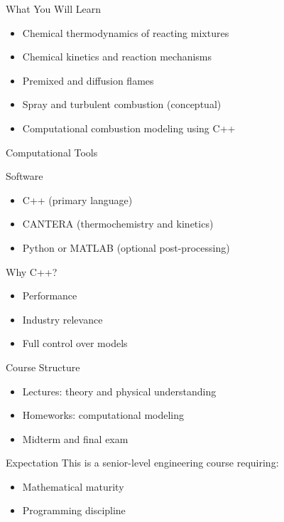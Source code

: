 \documentclass[aspectratio=169]{beamer}
\begin{document}
\begin{frame}{What You Will Learn}

\begin{itemize}
  \item Chemical thermodynamics of reacting mixtures
  \item Chemical kinetics and reaction mechanisms
  \item Premixed and diffusion flames
  \item Spray and turbulent combustion (conceptual)
  \item Computational combustion modeling using C++
\end{itemize}

\end{frame}

\begin{frame}{Computational Tools}

\begin{block}{Software}
\begin{itemize}
  \item C++ (primary language)
  \item CANTERA (thermochemistry and kinetics)
  \item Python or MATLAB (optional post-processing)
\end{itemize}
\end{block}

\pause

\begin{block}{Why C++?}
\begin{itemize}
  \item Performance
  \item Industry relevance
  \item Full control over models
\end{itemize}
\end{block}
\end{frame}

\begin{frame}{Course Structure}
\begin{itemize}
  \item Lectures: theory and physical understanding
  \item Homeworks: computational modeling
  \item Midterm and final exam
\end{itemize}

\vspace{0.3cm}

\begin{block}{Expectation}
This is a senior-level engineering course requiring:
\begin{itemize}
  \item Mathematical maturity
  \item Programming discipline
\end{itemize}
\end{block}
\end{frame}
\end{document}

